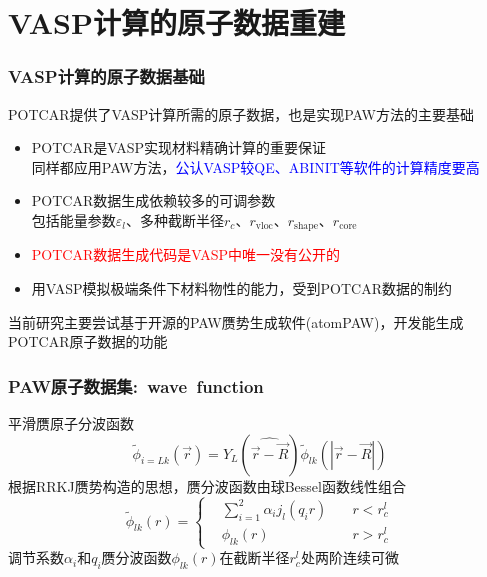 \section{\rm{VASP}计算的原子数据重建}
\frame
{
	\frametitle{\textrm{VASP}计算的原子数据基础}
	\textrm{POTCAR}提供了\textrm{VASP}计算所需的原子数据，也是实现\textrm{PAW}方法的主要基础
	\begin{itemize}
		\item \textrm{POTCAR}是\textrm{VASP}实现材料精确计算的重要保证\\
			同样都应用\textrm{PAW}方法，\textcolor{blue}{公认\textrm{VASP}较\textrm{QE}、\textrm{ABINIT}等软件的计算精度要高}
		\item \textrm{POTCAR}数据生成依赖较多的可调参数\\
			包括能量参数$\varepsilon_l$、多种截断半径$r_c$、$r_{\mathrm{vloc}}$、$r_{\mathrm{shape}}$、$r_{\mathrm{core}}$
		\item \textcolor{red}{\textrm{POTCAR}数据生成代码是\textrm{VASP}中唯一没有公开的}
		\item 用\textrm{VASP}模拟极端条件下材料物性的能力，受到\textrm{POTCAR}数据的制约
	\end{itemize}

当前研究主要尝试基于开源的\textrm{PAW}赝势生成软件(\textrm{atomPAW})，开发能生成\textrm{POTCAR}原子数据的功能
}

\frame
{
	\frametitle{\textrm{PAW}原子数据集:~\textrm{wave~function}}
	平滑赝原子分波函数
	\begin{displaymath}
		\tilde\phi_{i=Lk}(\vec r)=Y_L(\widehat{\vec r-\vec R})\tilde\phi_{lk}(|\vec r-\vec R|)
	\end{displaymath}
	根据\textrm{RRKJ}赝势构造的思想，赝分波函数由球\textrm{Bessel}函数线性组合%
	\begin{displaymath}
		\tilde\phi_{lk}(r)=\left\{
		\begin{aligned}
			&\sum_{i=1}^2\alpha_ij_l(q_ir)\quad &r<r_c^l\\
			&\phi_{lk}(r)\quad&r>r_c^l
		\end{aligned}
		\right.
	\end{displaymath}
	调节系数$\alpha_i$和$q_i$赝分波函数$\phi_{lk}(r)$在截断半径$r_c^l$处两阶连续可微
}

